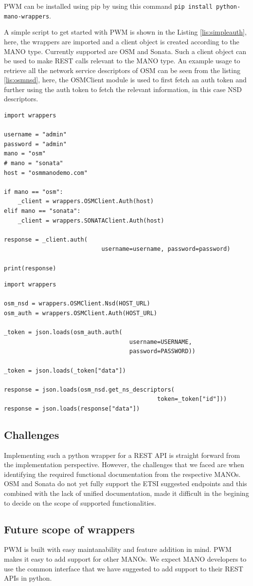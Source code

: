 PWM can be installed using pip by using this command \texttt{pip install python-mano-wrappers}. 

A simple script to get started with PWM is shown in the Listing \ref{lis:simpleauth}, here, the wrappers are imported and a client object is created according to the MANO type. 
Currently supported are OSM and Sonata. 
Such a client object can be used to make REST calls relevant to the MANO type. 
An example usage to retrieve all the network service descriptors of OSM can be seen from the listing \ref{lis:osmnsd}, here, the OSMClient module is used to first fetch an auth token and further using the auth token to fetch the relevant information, in this case NSD descriptors.


\begin{lstlisting}[caption=Simple wrapper code to fetch token, label=lis:simpleauth]
import wrappers

username = "admin"
password = "admin"
mano = "osm"
# mano = "sonata"
host = "osmmanodemo.com"

if mano == "osm":
	_client = wrappers.OSMClient.Auth(host)
elif mano == "sonata":
	_client = wrappers.SONATAClient.Auth(host)

response = _client.auth(
							username=username, password=password)

print(response)

\end{lstlisting}

\begin{lstlisting}[caption=Code to fetch all NSDs in OSM, label=lis:osmnsd]
import wrappers

osm_nsd = wrappers.OSMClient.Nsd(HOST_URL)
osm_auth = wrappers.OSMClient.Auth(HOST_URL)

_token = json.loads(osm_auth.auth(
									username=USERNAME,
									password=PASSWORD))

_token = json.loads(_token["data"])

response = json.loads(osm_nsd.get_ns_descriptors(
											token=_token["id"]))
response = json.loads(response["data"])
\end{lstlisting}

\subsection{Challenges}

Implementing such a python wrapper for a REST API is straight forward from the implementation perspective. 
However, the challenges that we faced are when identifying the required functional documentation from the respective MANOs. 
OSM and Sonata do not yet fully support the ETSI suggested endpoints and this combined with the lack of unified documentation, made it difficult in the begining to decide on the scope of supported functionalities.\\
  

\subsection{Future scope of wrappers}

PWM is built with easy maintanability and feature addition in mind. 
PWM makes it easy to add support for other MANOs. 
We expect MANO developers to use the common interface that we have suggested to add support to their REST APIs in python.

 
